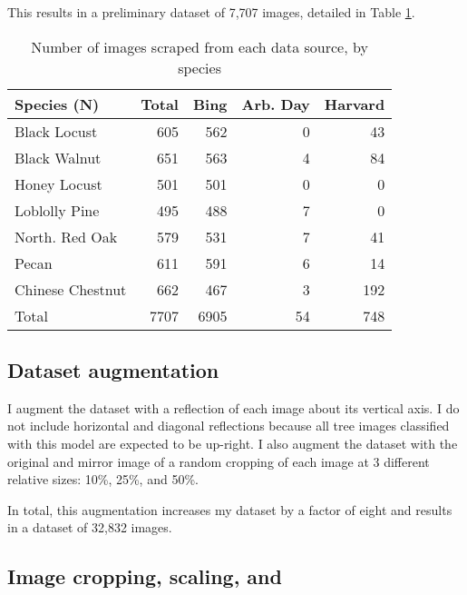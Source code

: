 \documentclass[10pt,twocolumn,letterpaper]{article}
\begin{document}
This results in a preliminary dataset of 7,707 images, detailed in Table \ref{tab:dataset_og}.

\begin{table}[!htbp]
   \begin{center}
    \small
   \begin{tabular}{|l|r|r|r|r|}
   \hline
   Species (N) & Total & Bing & Arb. Day & Harvard \\
   \hline\hline
   Black Locust & 605 & 562 & 0 & 43\\
    Black Walnut & 651 & 563 & 4 & 84\\
    Honey Locust & 501 & 501 & 0 & 0\\
    Loblolly Pine & 495 & 488 & 7 & 0\\
    North. Red Oak & 579 & 531 & 7 & 41\\
    Pecan & 611 & 591 & 6 & 14\\
    Chinese Chestnut & 662 & 467 & 3 &  192\\
    \hline\hline
    Total & 7707 & 6905 & 54 & 748\\
   \hline
   \end{tabular}
   \end{center}
   \caption{\label{tab:dataset_og} Number of images scraped from each data source, by species}
   \end{table}

\subsection{Dataset augmentation}

I augment the dataset with a reflection of each image about its vertical axis. I do not include horizontal and diagonal reflections because all tree images classified with this model are expected to be up-right. I also augment the dataset with the original and mirror image of a random cropping of each image at 3 different relative sizes: 10\%, 25\%, and 50\%. 

In total, this augmentation increases my dataset by a factor of eight and results in a dataset of 32,832 images.

\subsection{Image cropping, scaling, and }
\end{document}
